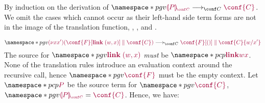 \proof
\label{prf:thm-pcp-to-pgv-operational-correspondence-soundness}
By induction on the derivation of $\pgv{\tm{\cpgvC{P}}\cred\tm{\conf{C}}}$.
We omit the cases which cannot occur as their left-hand side term forms are not in the image of the translation function, \ie {}, , and .

\begin{case*}
  \[\pgv{%
      \tm{\res{x}{x'}{(\ppar{\plug{\conf{F}}{\link\;\pair{w}{x}}}{\conf{C}})}}
      \cred
      \tm{\ppar{\plug{\conf{F}}{\unit}}{\subst{\conf{C}}{w}{x'}}}
    }\]
  The source for $\pgv{\tm{\link\;\pair{w}{x}}}$ \emph{must} be $\pcp{\tm{\link{w}{x}}}$. None of the translation rules introduce an evaluation context around the recursive call, hence $\pgv{\tm{\conf{F}}}$ must be the empty context. Let $\pcp{\tm{P}}$ be the source term for $\pgv{\tm{\conf{C}}}$, \ie $\pgv{\tm{\cpgvC{P}}=\tm{\conf{C}}}$. Hence, we have:
  \begin{mathpar}
  \end{mathpar}
\end{case*}
